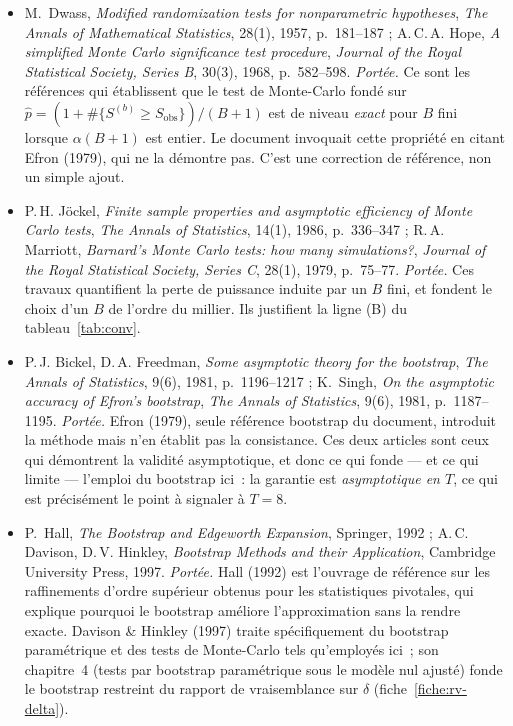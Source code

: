 \documentclass[a4paper,11pt]{article}
\begin{document}
\begin{itemize}[itemsep=4pt]
  \item M.~Dwass, \emph{Modified randomization tests for nonparametric
  hypotheses}, \emph{The Annals of Mathematical Statistics}, 28(1), 1957,
  p.~181--187 ; A.\,C.\,A. Hope, \emph{A simplified Monte Carlo significance
  test procedure}, \emph{Journal of the Royal Statistical Society, Series B},
  30(3), 1968, p.~582--598.
  \emph{Portée.} Ce sont les références qui établissent que le test
  de Monte-Carlo fondé sur $\hat p = (1 + \#\{S^{(b)} \ge S_{\text{obs}}\})/(B+1)$
  est de niveau \emph{exact} pour $B$ fini lorsque $\alpha(B+1)$ est entier. Le
  document invoquait cette propriété en citant Efron (1979), qui ne la
  démontre pas. C'est une correction de référence, non un simple ajout.

  \item P.\,H. Jöckel, \emph{Finite sample properties and asymptotic efficiency
  of Monte Carlo tests}, \emph{The Annals of Statistics}, 14(1), 1986,
  p.~336--347 ; R.\,A. Marriott, \emph{Barnard's Monte Carlo tests: how many
  simulations?}, \emph{Journal of the Royal Statistical Society, Series C},
  28(1), 1979, p.~75--77.
  \emph{Portée.} Ces travaux quantifient la perte de puissance
  induite par un $B$ fini, et fondent le choix d'un $B$ de l'ordre du millier.
  Ils justifient la ligne (B) du tableau~\ref{tab:conv}.

  \item P.\,J. Bickel, D.\,A. Freedman, \emph{Some asymptotic theory for the
  bootstrap}, \emph{The Annals of Statistics}, 9(6), 1981, p.~1196--1217 ;
  K.~Singh, \emph{On the asymptotic accuracy of Efron's bootstrap},
  \emph{The Annals of Statistics}, 9(6), 1981, p.~1187--1195.
  \emph{Portée.} Efron (1979), seule référence bootstrap du
  document, introduit la méthode mais n'en établit pas la consistance. Ces deux
  articles sont ceux qui démontrent la validité asymptotique, et donc ce qui
  fonde --- et ce qui limite --- l'emploi du bootstrap ici~: la garantie est
  \emph{asymptotique en $T$}, ce qui est précisément le point à signaler à
  $T = 8$.

  \item P.~Hall, \emph{The Bootstrap and Edgeworth Expansion}, Springer, 1992 ;
  A.\,C. Davison, D.\,V. Hinkley, \emph{Bootstrap Methods and their
  Application}, Cambridge University Press, 1997.
  \emph{Portée.} Hall (1992) est l'ouvrage de référence sur les
  raffinements d'ordre supérieur obtenus pour les statistiques pivotales, qui
  explique pourquoi le bootstrap améliore l'approximation sans la rendre exacte.
  Davison \& Hinkley (1997) traite spécifiquement du bootstrap paramétrique et
  des tests de Monte-Carlo tels qu'employés ici~; son chapitre~4 (tests par
  bootstrap paramétrique sous le modèle nul ajusté) fonde le bootstrap restreint
  du rapport de vraisemblance sur $\delta$ (fiche~\ref{fiche:rv-delta}).


\end{itemize}
\end{document}
